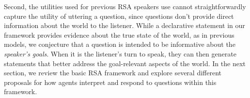 \documentclass[11pt, floatsintext]{apa6}
\begin{document}
Second, the utilities used for previous RSA speakers use cannot straightforwardly capture the utility of uttering a question, since questions don't provide direct information about the world to the listener.
While a declarative statement in our framework provides evidence about the true state of the world, as in previous models, we conjecture that a question is intended to be informative about the \emph{speaker's goals}. 
When it is the listener's turn to speak, they can then generate statements that better address the goal-relevant aspects of the world. 
In the next section, we review the basic RSA framework and explore several different proposals for how agents interpret and respond to questions within this framework.




\end{document}

